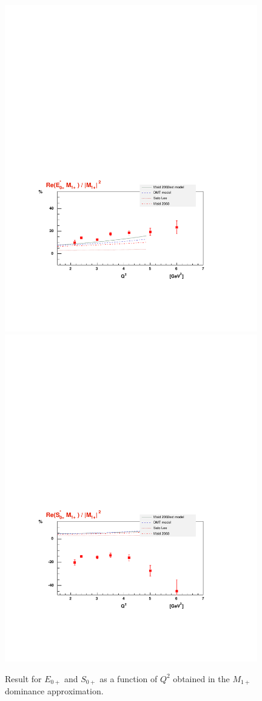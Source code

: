 \begin{figure}[h]
 \begin{center}
 \includegraphics[width = 11cm, bb=30 120 520 400]{analysis/img/E0p} 
 \includegraphics[width = 11cm, bb=30 110 520 400]{analysis/img/S0p} 
  \caption[Amplitudes of $E_{0+}$ and $S_{0+}$]
{  Result for  $E_{0+}$ and $S_{0+}$ as a function of $Q^2$ obtained in the $M_{1+}$ dominance approximation.}
 \label{fig:E0p}
\end{center}
\end{figure}
















